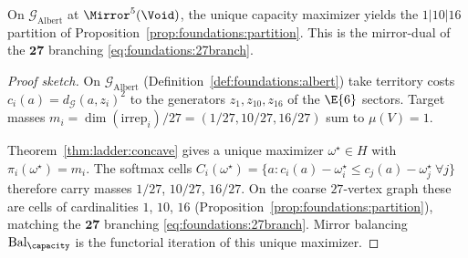\begin{theorem}\label{thm:ladder:capacity-jordan}
On $\mathcal{G}_{\mathrm{Albert}}$ at $\Mirror^5(\Void)$, the unique capacity
maximizer yields the $1|10|16$ partition of
Proposition~\ref{prop:foundations:partition}. This is the mirror-dual of the
$\mathbf{27}$ branching \eqref{eq:foundations:27branch}.
\end{theorem}

\begin{proof}[Proof sketch]
On $\mathcal{G}_{\mathrm{Albert}}$ (Definition~\ref{def:foundations:albert})
take territory costs $c_i(a)=d_{\mathcal{G}}(a,z_i)^2$ to the generators
$z_1,z_{10},z_{16}$ of the $\E{6}$ sectors. Target masses
$m_i=\dim(\mathrm{irrep}_i)/27=(1/27,10/27,16/27)$ sum to $\mu(V)=1$.

Theorem~\ref{thm:ladder:concave} gives a unique maximizer
$\omega^\star\in H$ with $\pi_i(\omega^\star)=m_i$. The softmax cells
$C_i(\omega^\star)=\{a: c_i(a)-\omega^\star_i\le c_j(a)-\omega^\star_j\
\forall j\}$ therefore carry masses $1/27$, $10/27$, $16/27$. On the coarse
$27$-vertex graph these are cells of cardinalities $1$, $10$, $16$
(Proposition~\ref{prop:foundations:partition}), matching the $\mathbf{27}$
branching \eqref{eq:foundations:27branch}. Mirror balancing
$\mathrm{Bal}_\capacity$ is the functorial iteration of this unique maximizer.
\end{proof}